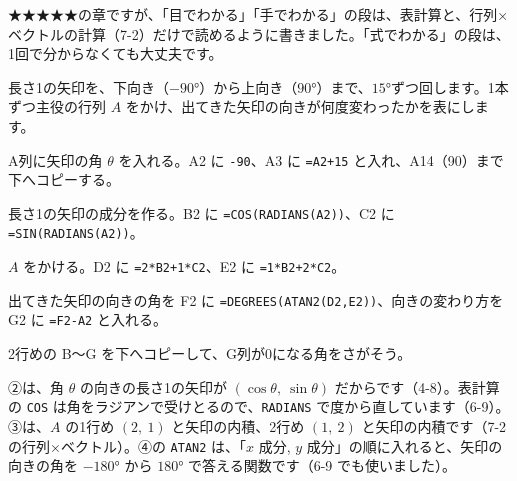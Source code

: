 ★★★★★の章ですが、「目でわかる」「手でわかる」の段は、表計算と、行列×ベクトルの計算（7-2）だけで読めるように書きました。「式でわかる」の段は、1回で分からなくても大丈夫です。

\begin{yattemiyou}
長さ1の矢印を、下向き（$-90°$）から上向き（$90°$）まで、$15°$ずつ回します。1本ずつ主役の行列 $A$ をかけ、出てきた矢印の向きが何度変わったかを表にします。
\begin{enumerate}[label={\bkcircled[bkGreen]{\arabic*}}, leftmargin=2.4\zw, itemsep=1pt, topsep=3pt]
\item A列に矢印の角 $\theta$ を入れる。A2 に \texttt{-90}、A3 に \texttt{=A2+15} と入れ、A14（90）まで下へコピーする。
\item 長さ1の矢印の成分を作る。B2 に \texttt{=COS(RADIANS(A2))}、C2 に \texttt{=SIN(RADIANS(A2))}。
\item $A$ をかける。D2 に \texttt{=2*B2+1*C2}、E2 に \texttt{=1*B2+2*C2}。
\item 出てきた矢印の向きの角を F2 に \texttt{=DEGREES(ATAN2(D2,E2))}、向きの変わり方を G2 に \texttt{=F2-A2} と入れる。
\item 2行めの B〜G を下へコピーして、G列が0になる角をさがそう。
\end{enumerate}
\end{yattemiyou}

\noindent ②は、角 $\theta$ の向きの長さ1の矢印が $(\cos\theta,\ \sin\theta)$ だからです（4-8）。表計算の \texttt{COS} は角をラジアンで受けとるので、\texttt{RADIANS} で度から直しています（6-9）。③は、$A$ の1行め $(2,\ 1)$ と矢印の内積、2行め $(1,\ 2)$ と矢印の内積です（7-2 の行列×ベクトル）。④の \texttt{ATAN2} は、「$x$ 成分, $y$ 成分」の順に入れると、矢印の向きの角を $-180°$ から $180°$ で答える関数です（6-9 でも使いました）。

